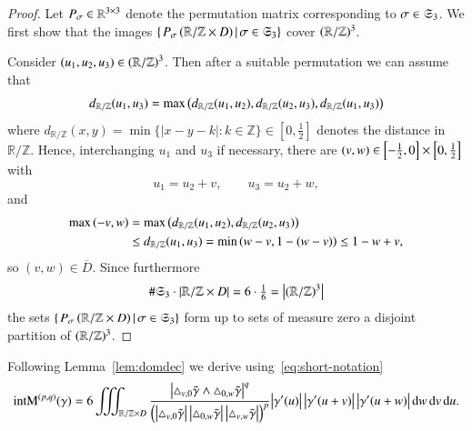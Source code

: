 \begin{proof}
 Let $P_{\sigma}\in\mathbb{R}^{3\times 3}$ denote the permutation matrix corresponding to $\sigma\in\mathfrak S_{3}$. 
 We first show that the images
 $\left\{\left.P_{\sigma}\left(\mathbb{R}/\mathbb{Z}\times D\right)\,\right|\sigma\in\mathfrak S_{3}\right\}$
 cover $(\mathbb{R}/\mathbb{Z})^{3}$.

 Consider $(u_{1},u_{2},u_{3})\in\left(\mathbb{R}/\mathbb{Z}\right)^{3}$. Then after a suitable permutation we can assume that
 \begin{equation*}
  d_{\mathbb R / \mathbb Z}(u_1,u_3) = \max\left(d_{\mathbb R / \mathbb Z}(u_1,u_2),d_{\mathbb R / \mathbb Z}(u_2,u_3),
  d_{\mathbb R / \mathbb Z}(u_1, u_3) \right)
 \end{equation*}
 where $d_{\mathbb R / \mathbb Z}(x,y) = \min\{|x-y-k|: k \in \mathbb Z\}
 \in[0,\frac12]$ denotes the
 distance in $\mathbb R / \mathbb Z$.
 Hence, interchanging $u_{1}$ and $u_{3}$ if necessary,
 there are $(v,w) \in \left[-\frac12,0\right]\times\left[0,\frac12\right]$ with
 $$
   u_1 = u_2 + v,\qquad u_3 = u_2 + w,
 $$
 and 
 \begin{align*} \max\left(-v,w\right) &=\max\left(d_{\mathbb{R}/\mathbb{Z}}(u_{1},u_{2}),d_{\mathbb{R}/\mathbb{Z}}(u_{2},u_{3})\right)
    \\ &\le d_{\mathbb{R}/\mathbb{Z}}(u_{1},u_{3}) = \min\left(w-v,1-(w-v)\right)\le1-w+v, \end{align*}
 so $(v,w) \in\overline D$.
 Since furthermore 
 \begin{equation*}
\#\mathfrak S_3 \cdot \left|\mathbb{R}/\mathbb{Z}\times D\right|=6 \cdot \tfrac16 = \left|(\mathbb R / \mathbb Z)^3\right|
 \end{equation*}
 the sets $\left\{\left.P_{\sigma}\left(\mathbb{R}/\mathbb{Z}\times D\right)\,\right|\sigma\in\mathfrak S_{3}\right\}$
 form up to sets of measure zero a disjoint partition of $(\mathbb{R}/\mathbb{Z})^{3}$.
\end{proof}


Following Lemma~\ref{lem:domdec} we derive using~\eqref{eq:short-notation}
\begin{equation}\label{eq:intM-sn''}
 \mathrm{intM}^{(p,q)}(\gamma)=6\iiint_{\mathbb{R}/\mathbb{Z}\times D}
 \frac{\left|\triangle_{v,0}{\tilde{\gamma}}\wedge\triangle_{0,w}{\tilde{\gamma}}\right|^{q}}{\left(\left|\triangle_{v,0}{\tilde{\gamma}}\right|\left|\triangle_{0,w}{\tilde{\gamma}}\right|\left|\triangle_{v,w}{\tilde{\gamma}}\right|\right)^p}
 {\left|{\gamma}'(u)\right|\left|{\gamma}'(u+v)\right|\left|{\gamma}'(u+w)\right|}
 {\,\mathrm{d} w\,\mathrm{d} v\,\mathrm{d} u}.
\end{equation}

